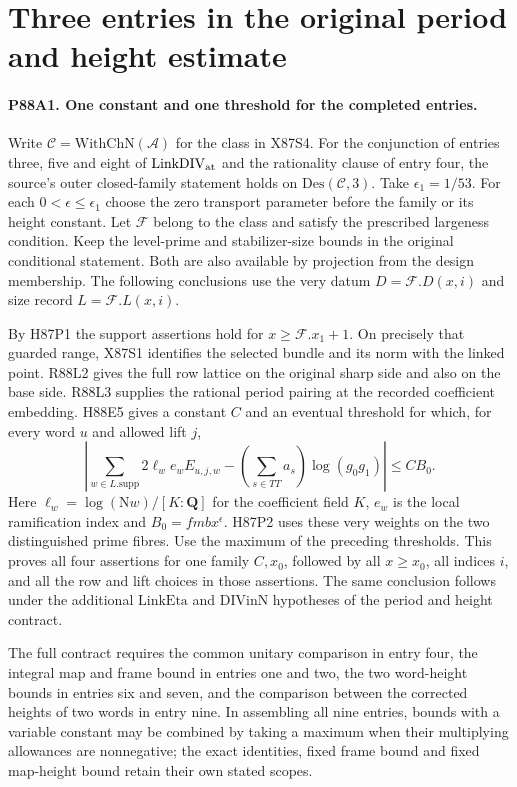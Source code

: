 \section{Three entries in the original period and height estimate}

\paragraph{P88A1. One constant and one threshold for the completed entries.}
Write $\mathcal C=\mathrm{WithChN}(\mathcal A)$ for the class
in X87S4. For the conjunction of entries three, five and eight of
$\mathrm{LinkDIV}_{\rm at}$ and the rationality clause of entry
four, the source's outer closed-family statement holds on
$\mathrm{Des}(\mathcal C,3)$. Take $\epsilon_1=1/53$.
For each $0<\epsilon\le\epsilon_1$ choose the zero transport
parameter before the family or its height constant. Let
$\mathcal F$ belong to the class and satisfy the prescribed
largeness condition. Keep the level-prime and stabilizer-size
bounds in the original conditional statement. Both are also
available by projection from the design membership. The following
conclusions use the very datum $D=\mathcal F.D(x,i)$ and size
record $L=\mathcal F.L(x,i)$.

By H87P1 the support assertions hold for $x\ge\mathcal F.x_1+1$.
On precisely that guarded range, X87S1 identifies the selected
bundle and its norm with the linked point. R88L2 gives the full
row lattice on the original sharp side and also on the base side.
R88L3 supplies the rational period pairing at the recorded
coefficient embedding. H88E5 gives a constant $C$ and an
eventual threshold for which, for every word $u$ and allowed
lift $j$,
\[
 \left|\sum_{w\in L.\mathrm{supp}}2\ell_w e_w E_{u,j,w}
       -\left(\sum_{s\in TT}a_s\right)\log(g_0g_1)\right|
    \le C B_0 .
\]
Here $\ell_w=\log(\mathrm{N}w)/[K:\mathbf Q]$ for the coefficient
field $K$, $e_w$ is the local ramification index and
$B_0=fmbx^\epsilon$. H87P2 uses these very weights on the two
distinguished prime fibres. Use the maximum of the preceding
thresholds. This proves all four assertions for one family $C,x_0$,
followed by all $x\ge x_0$, all indices $i$, and all the row and
lift choices in those assertions. The same conclusion follows
under the additional $\mathrm{LinkEta}$ and $\mathrm{DIVinN}$
hypotheses of the period and height contract.

The full contract requires the common unitary comparison in
entry four, the integral map and frame bound in entries one and
two, the two word-height bounds in entries six and seven, and
the comparison between the corrected heights of two words in
entry nine. In assembling all nine entries, bounds with a
variable constant may be combined by taking a maximum when
their multiplying allowances are nonnegative; the exact
identities, fixed frame bound and fixed map-height bound retain
their own stated scopes.
